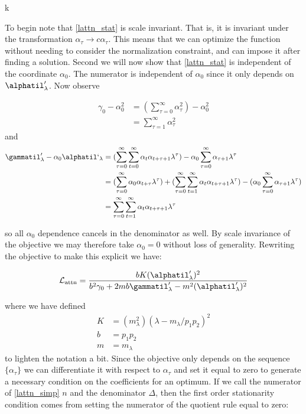 k\documentclass{article}
\begin{document}
To begin note that \eqref{lattn_stat} is scale invariant. That is, it is invariant under the transformation $\alpha_\tau \to c\alpha_\tau$. This means that we can optimize the function without needing to consider the normalization constraint, and can impose it after finding a solution. Second we will now show that \eqref{lattn_stat} is independent of the coordinate $\alpha_0$. The numerator is independent of $\alpha_0$ since it only depends on $\alphatil'_\lambda$. Now observe

\begin{align}
    \gamma_0 - \alpha_0^2 &= (\sum_{\tau=0}^\infty \alpha_\tau^2) - \alpha_0^2 \\
    &= \sum_{\tau=1}^\infty \alpha_\tau^2
\end{align}
 and 
 \begin{align}
    \gammatil'_\lambda - \alpha_0\alphatil`_\lambda &= (\sum_{\tau=0}^\infty\sum_{t=0}^\infty \alpha_t \alpha_{t+\tau+1}\lambda^\tau) - \alpha_0\sum_{\tau=0}^\infty \alpha_{\tau+1}\lambda^\tau \\
    &= (\sum_{\tau=0}^\infty\alpha_0 \alpha_{t+\tau}\lambda^\tau) + (\sum_{\tau=0}^\infty\sum_{t=1}^\infty \alpha_t \alpha_{t+\tau+1}\lambda^\tau) - ( \alpha_0\sum_{\tau=0}^\infty \alpha_{\tau+1}\lambda^\tau)\\
    &= \sum_{\tau=0}^\infty\sum_{t=1}^\infty \alpha_t \alpha_{t+\tau+1}\lambda^\tau
\end{align}

so all $\alpha_0$ dependence cancels in the denominator as well. By scale invariance of the objective we may therefore take $\alpha_0 = 0$ without loss of generality. Rewriting the objective to make this explicit we have:

\begin{equation}\label{lattn_simp}
    \mathcal{L}_{\text{attn}} = \frac{bK (\alphatil'_\lambda)^2}{b^2\gamma_0 + 2mb\gammatil_\lambda' - m^2(\alphatil'_\lambda)^2}
\end{equation}

where we have defined 
\begin{align}
    K &= (m_\lambda^2)(\lambda - m_\lambda/p_1p_2)^2\\
    b &= p_1p_2 \\
    m &= m_\lambda
\end{align}
to lighten the notation a bit. Since the objective only depends on the sequence $\{\alpha_\tau\}$ we can differentiate it with respect to $\alpha_\tau$ and set it equal to zero to generate a necessary condition on the coefficients for an optimum. If we call the numerator of \eqref{lattn_simp} $n$ and the denominator $\Delta$, then the first order stationarity condition comes from setting the numerator of the quotient rule equal to zero:
\end{document}
